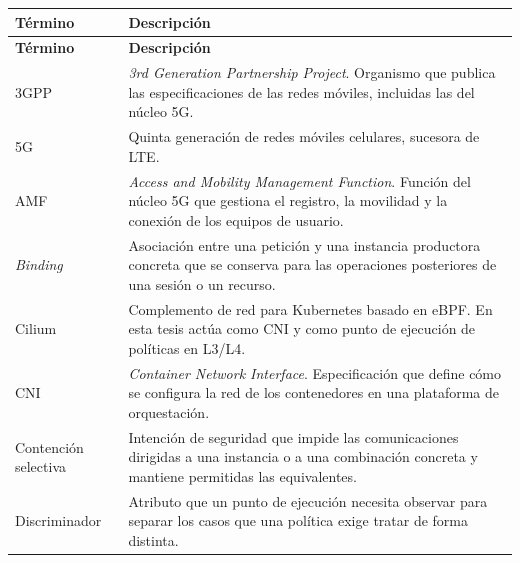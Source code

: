 \thispagestyle{fancy}

\begin{singlespace}
\small
\renewcommand{\arraystretch}{1.25}
\begin{longtable}{@{}>{\raggedright\arraybackslash}p{}>{\raggedright\arraybackslash}p{}@{}}
    \toprule
    \textbf{Término} & \textbf{Descripción} \\
    \midrule
    \endfirsthead

    \toprule
    \textbf{Término} & \textbf{Descripción} \\
    \midrule
    \endhead

    \endfoot

    \bottomrule
    \endlastfoot

    3GPP & \textit{3rd Generation Partnership Project}. Organismo que publica las especificaciones de las redes móviles, incluidas las del núcleo 5G. \\

    5G & Quinta generación de redes móviles celulares, sucesora de LTE. \\

    AMF & \textit{Access and Mobility Management Function}. Función del núcleo 5G que gestiona el registro, la movilidad y la conexión de los equipos de usuario. \\

    \textit{Binding} & Asociación entre una petición y una instancia productora concreta que se conserva para las operaciones posteriores de una sesión o un recurso. \\

    Cilium & Complemento de red para Kubernetes basado en eBPF. En esta tesis actúa como CNI y como punto de ejecución de políticas en L3/L4. \\

    CNI & \textit{Container Network Interface}. Especificación que define cómo se configura la red de los contenedores en una plataforma de orquestación. \\

    Contención selectiva & Intención de seguridad que impide las comunicaciones dirigidas a una instancia o a una combinación concreta y mantiene permitidas las equivalentes. \\

    Discriminador & Atributo que un punto de ejecución necesita observar para separar los casos que una política exige tratar de forma distinta. \\


\end{longtable}
\end{singlespace}
